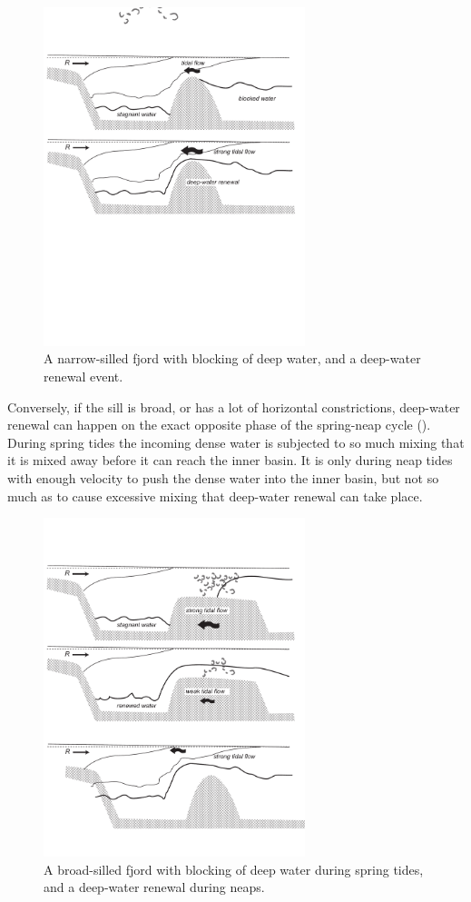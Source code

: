 \begin{figure}[htb]
  \centering
  \includegraphics[width=3in]{figs/EstuaryBlocking}
  \caption{A narrow-silled fjord with blocking of deep water, and a
    deep-water renewal event.}
  \label{fig:EstuaryBlocking}
\end{figure}

Conversely, if the sill is broad, or has a lot of horizontal constrictions, deep-water renewal can happen on the exact opposite phase of the spring-neap cycle ().  During spring tides the incoming dense water is subjected to so much mixing that it is mixed away before it can reach the inner basin.  It is only during neap tides with enough velocity to push the dense water into the inner basin, but not so much as to cause excessive mixing that deep-water renewal can take place.

\begin{figure}[htb]
  \centering
  \includegraphics[width=3in]{figs/EstuaryBroadSill}
  \caption{A broad-silled fjord with blocking of deep water during
    spring tides, and a deep-water renewal during neaps.}
  \label{fig:EstuaryBroadSill}
\end{figure}




